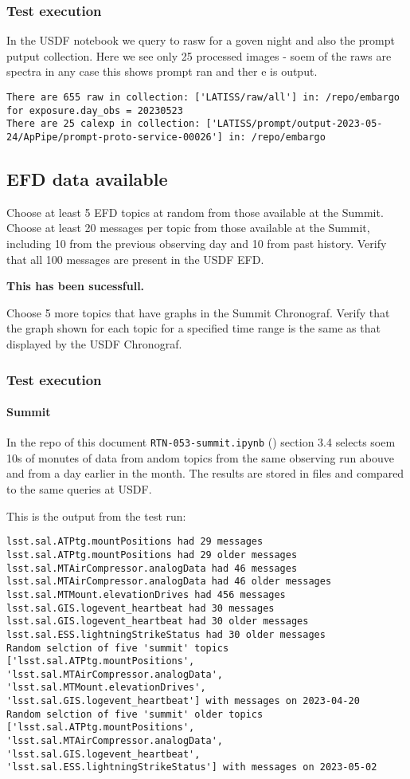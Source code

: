 \subsubsection{Test execution}
In the USDF notebook we query to rasw for a goven night and also the prompt putput collection.
Here we see only 25 processed images - soem of the raws are spectra in any case this shows prompt ran and ther e is output.
\begin{lstlisting}
There are 655 raw in collection: ['LATISS/raw/all'] in: /repo/embargo for exposure.day_obs = 20230523
There are 25 calexp in collection: ['LATISS/prompt/output-2023-05-24/ApPipe/prompt-proto-service-00026'] in: /repo/embargo
\end{lstlisting}


\subsection{EFD data available }
Choose at least 5 EFD topics at random from those available at the Summit.
Choose at least 20 messages per topic from those available at the Summit, including 10 from the previous observing day and 10 from past history.
Verify that all 100 messages are present in the USDF EFD.

\textbf{This has been sucessfull.}

Choose 5 more topics that have graphs in the Summit Chronograf.
Verify that the graph shown for each topic for a specified time range is the same as that displayed by the USDF Chronograf.
\subsubsection{Test execution}
\paragraph{Summit} \label{sec:efdsummit}
In the repo of this document \texttt{RTN-053-summit.ipynb} ()  section 3.4
selects soem 10s of monutes of data from andom topics from the same observing run abouve and from a day earlier in the month.
The results are stored in files and compared to the same  queries at USDF.

This is the output from the test run:

\begin{lstlisting}
lsst.sal.ATPtg.mountPositions had 29 messages
lsst.sal.ATPtg.mountPositions had 29 older messages
lsst.sal.MTAirCompressor.analogData had 46 messages
lsst.sal.MTAirCompressor.analogData had 46 older messages
lsst.sal.MTMount.elevationDrives had 456 messages
lsst.sal.GIS.logevent_heartbeat had 30 messages
lsst.sal.GIS.logevent_heartbeat had 30 older messages
lsst.sal.ESS.lightningStrikeStatus had 30 older messages
Random selction of five 'summit' topics ['lsst.sal.ATPtg.mountPositions',
'lsst.sal.MTAirCompressor.analogData', 'lsst.sal.MTMount.elevationDrives',
'lsst.sal.GIS.logevent_heartbeat'] with messages on 2023-04-20
Random selction of five 'summit' older topics ['lsst.sal.ATPtg.mountPositions',
'lsst.sal.MTAirCompressor.analogData', 'lsst.sal.GIS.logevent_heartbeat',
'lsst.sal.ESS.lightningStrikeStatus'] with messages on 2023-05-02
\end{lstlisting}


